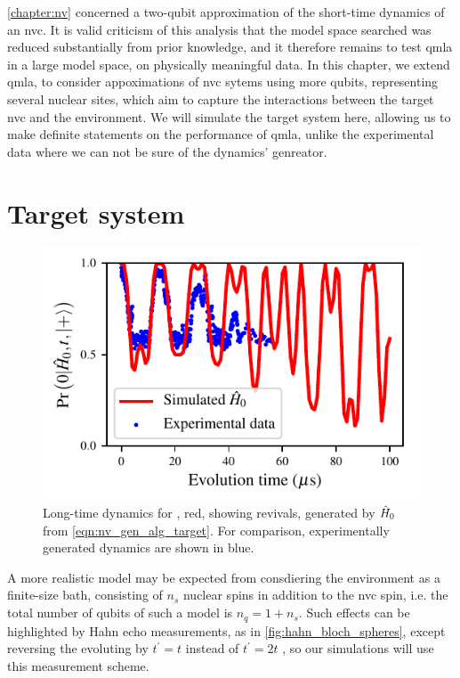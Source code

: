 \cref{chapter:nv} concerned a two-qubit approximation of the short-time dynamics of an \gls{nvc}. 
It is valid criticism of this analysis that the model space searched was reduced substantially from prior knowledge,
    and it therefore remains to test \gls{qmla} in a large model space, on physically meaningful data. 
In this chapter, we extend \gls{qmla}, to consider appoximations of \gls{nvc} sytems using more qubits, 
    representing several nuclear sites, which aim to capture the interactions between the 
    target \gls{nvc} and the environment. 
We will simulate the target system here, allowing us to make definite statements on the performance of \gls{qmla}, 
    unlike the experimental data where we can not be sure of the dynamics' genreator.

\par 

\section{Target system}
\begin{figure}
    \begin{center}
        \includegraphics{experimental_study/figures/nv_revival_raw_data.pdf}
    \end{center}
    \caption[Long-time dynamics for ]{
        Long-time dynamics for , red, showing revivals, 
            generated by $\hat{H}_0$ from \cref{eqn:nv_gen_alg_target}.
        For comparison, experimentally generated dynamics are shown in blue. 
    }
    \label{fig:nv_revival_raw}
\end{figure}
A more realistic model may be expected from consdiering the environment as a finite-size bath, 
    consisting of $n_s$ nuclear spins in addition to the \gls{nvc} spin, 
    i.e. the total number of qubits of such a model is $n_q = 1 + n_s$.   
Such effects can be highlighted by Hahn echo measurements, 
    as in \cref{fig:hahn_bloch_spheres}, 
    except reversing the evoluting by $t^{\prime} = t$ instead of $t^{\prime} = 2t$
    \cite{childress2006coherent, breuer2002theory}, so our simulations will use this measurement scheme. 
\par 

